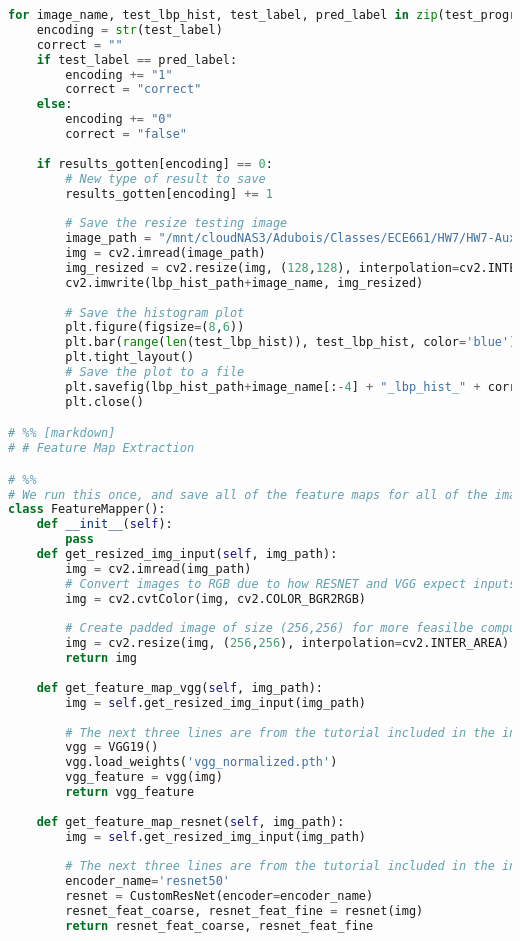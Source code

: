 \documentclass{article}
\begin{document}
\begin{lstlisting}[language=Python]
for image_name, test_lbp_hist, test_label, pred_label in zip(test_progress_bar, test_lbp_hist_list, test_labels_list, predicted_labels):
    encoding = str(test_label)
    correct = ""
    if test_label == pred_label:
        encoding += "1"
        correct = "correct"
    else:
        encoding += "0"
        correct = "false"
    
    if results_gotten[encoding] == 0:
        # New type of result to save
        results_gotten[encoding] += 1
        
        # Save the resize testing image
        image_path = "/mnt/cloudNAS3/Adubois/Classes/ECE661/HW7/HW7-Auxilliary/data/testing/" + image_name
        img = cv2.imread(image_path)
        img_resized = cv2.resize(img, (128,128), interpolation=cv2.INTER_AREA)
        cv2.imwrite(lbp_hist_path+image_name, img_resized)
        
        # Save the histogram plot
        plt.figure(figsize=(8,6))
        plt.bar(range(len(test_lbp_hist)), test_lbp_hist, color='blue')  # Customize color as needed
        plt.tight_layout()
        # Save the plot to a file
        plt.savefig(lbp_hist_path+image_name[:-4] + "_lbp_hist_" + correct + ".png", format='png', dpi=300)
        plt.close()

# %% [markdown]
# # Feature Map Extraction

# %%
# We run this once, and save all of the feature maps for all of the images to save computation time during debugging
class FeatureMapper():
    def __init__(self):
        pass
    def get_resized_img_input(self, img_path):
        img = cv2.imread(img_path)
        # Convert images to RGB due to how RESNET and VGG expect inputs
        img = cv2.cvtColor(img, cv2.COLOR_BGR2RGB)
        
        # Create padded image of size (256,256) for more feasilbe computation
        img = cv2.resize(img, (256,256), interpolation=cv2.INTER_AREA)
        return img
        
    def get_feature_map_vgg(self, img_path):
        img = self.get_resized_img_input(img_path)
        
        # The next three lines are from the tutorial included in the instructions
        vgg = VGG19()
        vgg.load_weights('vgg_normalized.pth')
        vgg_feature = vgg(img)
        return vgg_feature
        
    def get_feature_map_resnet(self, img_path):
        img = self.get_resized_img_input(img_path)
        
        # The next three lines are from the tutorial included in the instructions
        encoder_name='resnet50'
        resnet = CustomResNet(encoder=encoder_name)
        resnet_feat_coarse, resnet_feat_fine = resnet(img)
        return resnet_feat_coarse, resnet_feat_fine


\end{lstlisting}
\end{document}
